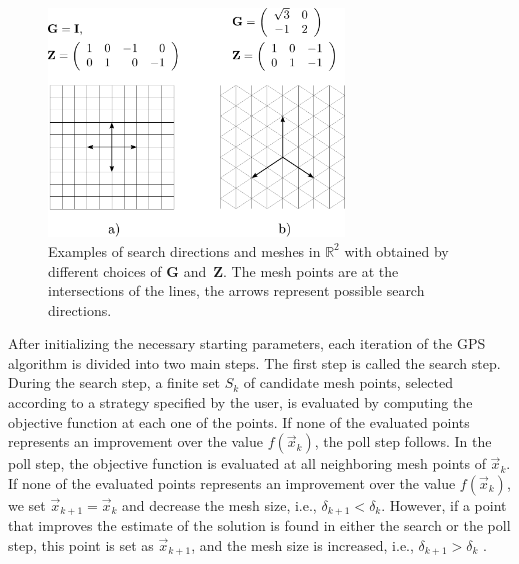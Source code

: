 \begin{figure}[H]
	\centering
	\vspace{1cm}
	\includegraphics[width=0.70\textwidth]{figures/gps.pdf}
	\caption{Examples of search directions and meshes in $\mathbb{R}^2$ with
		obtained by different choices of $\mathbf{G}$ and~$\mathbf{Z}$. The mesh points
		are at the intersections of the lines, the arrows represent possible search directions.}
	\label{fig:gps}
\end{figure}


After initializing the necessary starting parameters, each iteration of the GPS algorithm is divided into two main steps. The first step is called the search step. During the search step, a finite set $S_k$ of candidate mesh points, selected according to a strategy specified by the user, is evaluated by computing the objective function at each one of the points. If none of the evaluated points represents an improvement over the value $ f(\vec{x}_k) $, the poll step follows. In the poll step, the objective function is evaluated at all neighboring mesh points of $ \vec{x}_k $. If none of the evaluated points represents an improvement over the value $ f(\vec{x}_k) $, we set $ \vec{x}_{k+1} = \vec{x}_k $ and decrease the mesh size, i.e., $ \delta_{k+1} < \delta_k $. However, if a point that improves the estimate of the solution is found in either the search or the poll step, this point is set as $ \vec{x}_{k+1} $, and the mesh size is increased, i.e., $ \delta_{k+1} > \delta_k $ \cite{BBO-textbook, Audet2002}.

